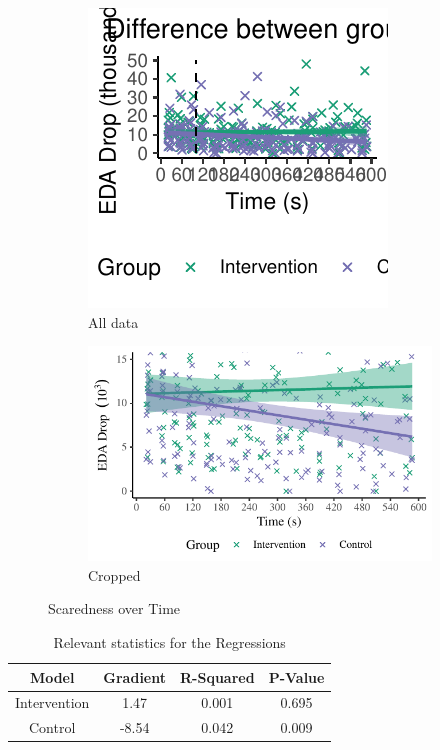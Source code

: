 \documentclass[12pt,a4paper]{article}\usepackage[]{graphicx}\usepackage[]{color}
\makeatletter
\def\maxwidth{ %
  \ifdim\Gin@nat@width>\linewidth
    \linewidth
  \else
    \Gin@nat@width
  \fi
}
\makeatother
\begin{document}
\begin{figure}
  \centering
  \begin{subfigure}[t]{.49\linewidth}


{\centering \includegraphics[width=\maxwidth]{figure/ScarednessOverTime-1} 

}



    \caption{All data}
  \end{subfigure}
  \begin{subfigure}[t]{.49\linewidth}


{\centering \includegraphics[width=\maxwidth]{figure/ScarednessOverTimeCrop-1} 

}



    \caption{Cropped}
  \end{subfigure}
  \caption{Scaredness over Time}
  \label{fig:ScarednessOverTime}
\end{figure}

\begin{table}[t]

\caption{\label{tab:RegressionTable}Relevant statistics for the Regressions}
\centering
\begin{tabular}{cccc}
\toprule
\textbf{Model} & \textbf{Gradient} & \textbf{R-Squared} & \textbf{P-Value}\\
\midrule
Intervention & 1.47 & 0.001 & 0.695\\
Control & -8.54 & 0.042 & 0.009\\
\bottomrule
\end{tabular}
\end{table}
\end{document}
